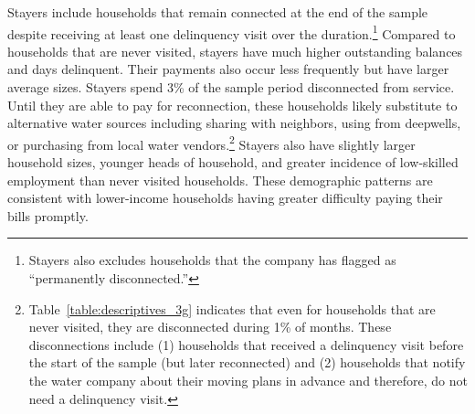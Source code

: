 \documentclass[12pt]{article}
\begin{document}
Stayers include households that remain connected at the end of the sample despite receiving at least one delinquency visit over the duration.\footnote{Stayers also excludes households that the company has flagged as ``permanently disconnected.''}  Compared to households that are never visited, stayers have much higher outstanding balances and days delinquent.  Their payments also occur less frequently but have larger average sizes.  Stayers spend 3\% of the sample period disconnected from service.  Until they are able to pay for reconnection, these households likely substitute to alternative water sources including sharing with neighbors, using from deepwells, or purchasing from local water vendors.\footnote{Table~\ref{table:descriptives_3g} indicates that even for households that are never visited, they are disconnected during 1\% of months.  These disconnections include (1) households that received a delinquency visit before the start of the sample (but later reconnected) and (2) households that notify the water company about their moving plans in advance and therefore, do not need a delinquency visit.}  Stayers also have slightly larger household sizes, younger heads of household, and greater incidence of low-skilled employment than never visited households.  These demographic patterns are consistent with lower-income households having greater difficulty paying their bills promptly.
\end{document}
